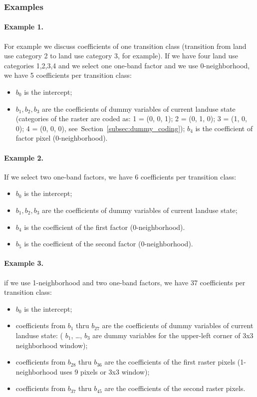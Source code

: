 \documentclass{report}
\begin{document}
\subsubsection{Examples}
\paragraph{Example 1.}
For example we discuss coefficients of one transition class (transition from land use category 2 to land use category 3, for example). If we have four land use categories 1,2,3,4 and we select one one-band factor and we use 0-neighborhood, we have 5 coefficients per transition class:
\begin{itemize}
    \item $b_{0}$ is the intercept;
    \item $b_{1},b_{2},b_{3}$ are the coefficients of dummy variables of current landuse state (categories of the raster are coded as: 1 = (0, 0, 1); 2 = (0, 1, 0); 3 = (1, 0, 0); 4 = (0, 0, 0), see~Section~\ref{subsec:dummy_coding});
      $b_{4}$ is the coefficient of factor pixel (0-neighborhood).
\end{itemize}

\paragraph{Example 2.}
If we select two one-band factors, we have 6 coefficients per transition class:
\begin{itemize}
  \item $b_{0}$ is the intercept;
  \item $b_{1},b_{2},b_{3}$ are the coefficients of dummy variables of current landuse state;
  \item $b_{4}$ is the coefficient of the first factor (0-neighborhood).
  \item $b_{5}$ is the coefficient of the second factor (0-neighborhood).
\end{itemize}

\paragraph{Example 3.}
if we use 1-neighborhood and two one-band factors, we have 37 coefficients per transition class:
\begin{itemize}
  \item $b_{0}$ is the intercept;
  \item coefficients from $b_{1}$ thru $b_{27}$ are the coefficients of dummy variables of current landuse state: ( $b_{1}$, \dots, $b_{3}$ are dummy variables for the upper-left corner of 3x3 neighborhood window);
  \item coefficients from $b_{28}$ thru $b_{36}$ are the coefficients of the first raster pixels (1-neighborhood uses 9 pixels or 3x3 window);
  \item coefficients from $b_{37}$ thru $b_{45}$ are the coefficients of the second raster pixels.
\end{itemize}
\end{document}
